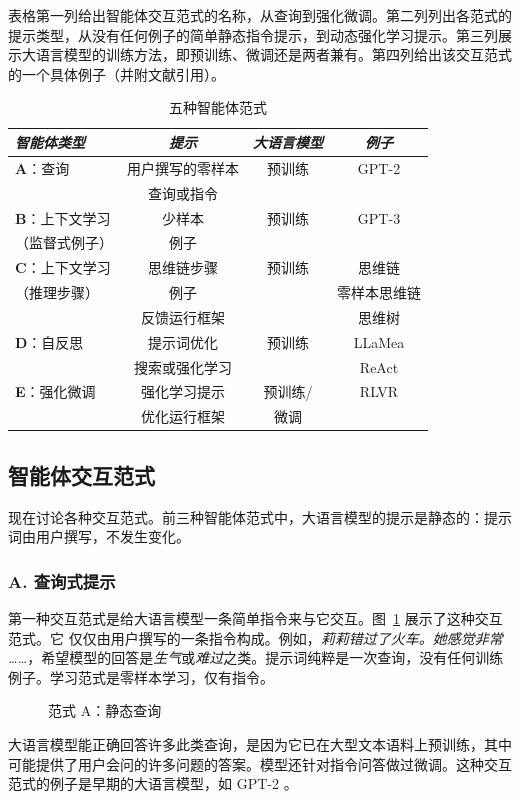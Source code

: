 表格第一列给出智能体交互范式的名称，从查询到强化微调。第二列列出各范式的提示类型，从没有任何例子的简单静态指令提示，到动态强化学习提示。第三列展示大语言模型的训练方法，即预训练、微调还是两者兼有。第四列给出该交互范式的一个具体例子（并附文献引用）。

\begin{table}
\footnotesize\centering
\begin{tabular}{l|c|c|c}
{\em 智能体类型} & {\em 提示} & {\em 大语言模型}  & {\em 例子} \\ \hline
{\bf A}：查询 & 用户撰写的零样本  & 预训练   & GPT-2 \citep{vaswani2017attention}\\
 & 查询或指令 &   & \\ \hline
{\bf B}：上下文学习  & 少样本   & 预训练   & GPT-3 \citep{brown2020language}\\ 
（监督式例子）& 例子 &    & \\ \hline
{\bf C}：上下文学习  & 思维链步骤   & 预训练   & 思维链 \citep{wei2022chain}\\ 
（推理步骤）& 例子 &    & 零样本思维链 \citep{kojima2022large}\\ \hline
 & 反馈运行框架   &   & 思维树 \citep{yao2024tree}\\
{\bf D}：自反思  & 提示词优化 & 预训练   &  LLaMea \citep{van2024llamea}\\
 & 搜索或强化学习&   &   ReAct \citep{yao2022react}\\ \hline
{\bf E}：强化微调  & 强化学习提示  & 预训练/   & RLVR  \citep{lambert2024tulu}\\ 
 & 优化运行框架 & 微调   & \\ 
\end{tabular} 
    \caption{五种智能体范式}\label{tab:fourstyles}
\end{table}


\subsection{智能体交互范式}
现在讨论各种交互范式。前三种智能体范式中，大语言模型的提示是静态的：提示词由用户撰写，不发生变化。


\subsubsection{A. 查询式提示}
第一种交互范式是给大语言模型一条简单指令来与它交互。图~\ref{fig:rlA} 展示了这种交互范式。它
仅仅由用户撰写的一条指令构成。例如，{\em 莉莉错过了火车。她感觉非常 ……}，希望模型的回答是{\em 生气}或{\em 难过}之类。提示词纯粹是一次查询，没有任何训练例子。学习范式是零样本学习，仅有指令。
\begin{figure}
  \begin{center}
    
    \caption{范式 A：静态查询}\label{fig:rlA}
  \end{center}
\end{figure}
大语言模型能正确回答许多此类查询，是因为它已在大型文本语料上预训练，其中可能提供了用户会问的许多问题的答案。模型还针对指令问答做过微调。这种交互范式的例子是早期的大语言模型，如 GPT-2 \citep{vaswani2017attention}。


